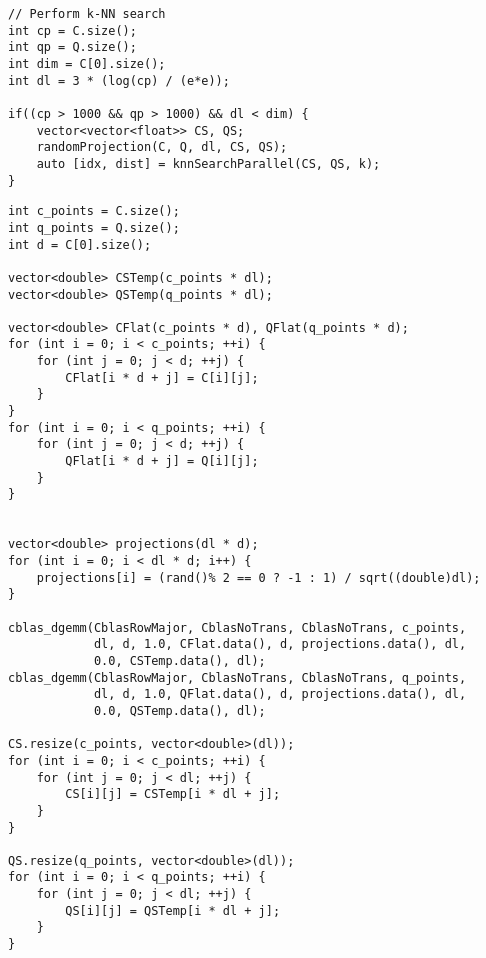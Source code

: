 \documentclass[12pt]{report}
\begin{document}
\begin{lstlisting}[style=cppstyle]
// Perform k-NN search
int cp = C.size();
int qp = Q.size();
int dim = C[0].size();
int dl = 3 * (log(cp) / (e*e));

if((cp > 1000 && qp > 1000) && dl < dim) {
    vector<vector<float>> CS, QS;
    randomProjection(C, Q, dl, CS, QS);
    auto [idx, dist] = knnSearchParallel(CS, QS, k);
}
\end{lstlisting}

\newpage
\begin{lstlisting}[style=cppstyle]
int c_points = C.size();
int q_points = Q.size();
int d = C[0].size();

vector<double> CSTemp(c_points * dl);
vector<double> QSTemp(q_points * dl);

vector<double> CFlat(c_points * d), QFlat(q_points * d);
for (int i = 0; i < c_points; ++i) {
    for (int j = 0; j < d; ++j) {
        CFlat[i * d + j] = C[i][j];
    }
}
for (int i = 0; i < q_points; ++i) {
    for (int j = 0; j < d; ++j) {
        QFlat[i * d + j] = Q[i][j];
    }
}


vector<double> projections(dl * d);
for (int i = 0; i < dl * d; i++) {
    projections[i] = (rand()% 2 == 0 ? -1 : 1) / sqrt((double)dl);
}

cblas_dgemm(CblasRowMajor, CblasNoTrans, CblasNoTrans, c_points,
            dl, d, 1.0, CFlat.data(), d, projections.data(), dl,
            0.0, CSTemp.data(), dl);
cblas_dgemm(CblasRowMajor, CblasNoTrans, CblasNoTrans, q_points,
            dl, d, 1.0, QFlat.data(), d, projections.data(), dl,
            0.0, QSTemp.data(), dl);

CS.resize(c_points, vector<double>(dl));
for (int i = 0; i < c_points; ++i) {
    for (int j = 0; j < dl; ++j) {
        CS[i][j] = CSTemp[i * dl + j];
    }
}

QS.resize(q_points, vector<double>(dl));
for (int i = 0; i < q_points; ++i) {
    for (int j = 0; j < dl; ++j) {
        QS[i][j] = QSTemp[i * dl + j];
    }
}
\end{lstlisting}
\newpage
\end{document}
